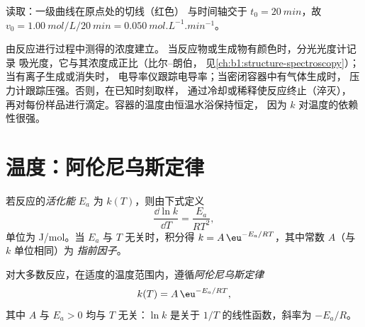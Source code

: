 \begin{omfigure}

{\small 读取：一级曲线在原点处的切线（红色）
与时间轴交于 $t_0 = \qty{20}{min}$，故 $v_0 =
\qty{1.00}{mol/L}/\qty{20}{min} = \qty{0.050}{mol.L^{-1}.min^{-1}}$。}
\end{omfigure}

\begin{inthelab}[跟踪反应随时间的变化]
由反应进行过程中测得的浓度建立。
当反应物或生成物有颜色时，分光光度计记录
吸光度，它与其浓度成正比（比尔–朗伯，
见\cref{ch:b1:structure-spectroscopy}）；当有离子生成或消失时，
电导率仪跟踪电导率；当密闭容器中有气体生成时，
压力计跟踪压强。否则，在已知时刻取样，
通过冷却或稀释使反应终止（淬灭），
再对每份样品进行滴定。容器的温度由恒温水浴保持恒定，
因为 $k$ 对温度的依赖性很强。
\end{inthelab}

\section{温度：阿伦尼乌斯定律}

\begin{definition}[活化能]\label{def:b1:rate-laws:activation-energy}
若反应的\emph{活化能} $E_a$
为 $k(T)$，则由下式定义
\[
  \frac{\dd \ln k}{\dd T} = \frac{E_a}{RT^2} ,
\]
单位为 \unit{J/mol}。当 $E_a$ 与 $T$ 无关时，积分得
$k = A\,\eu^{-E_a/RT}$，其中常数 $A$（与 $k$ 单位相同）为
\emph{指前因子}。
\end{definition}

\begin{theorem}[阿伦尼乌斯定律]\label{thm:b1:rate-laws:arrhenius}
对大多数反应，在适度的温度范围内，遵循\emph{阿伦尼乌斯定律}
\[
  k(T) = A\,\eu^{-E_a/RT} ,
\]
其中 $A$ 与 $E_a > 0$ 均与 $T$ 无关：$\ln k$ 是关于
$1/T$ 的线性函数，斜率为 $-E_a/R$。
\end{theorem}
\admitted


